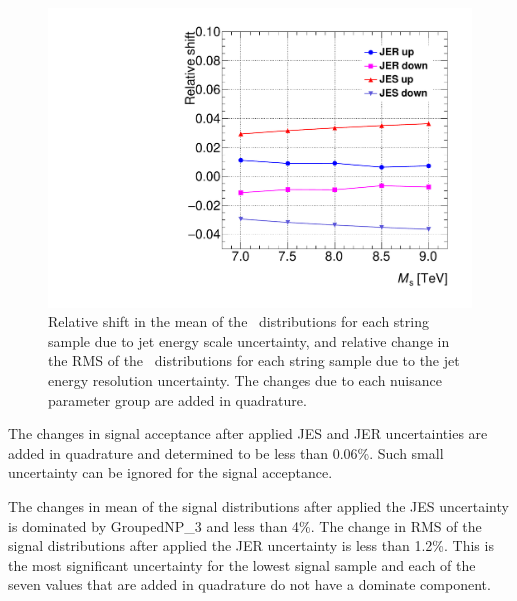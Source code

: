 \begin{figure}[htb]
\begin{center}
\includegraphics[width=0.65\linewidth]{fig/strings/JES_JER}
\end{center}
\caption{Relative shift in the mean of the \mjj\ distributions for each
string sample due to jet energy scale uncertainty, and relative change
in the RMS of the \mjj\ distributions for each string sample due to the
jet energy resolution uncertainty.
The changes due to each nuisance parameter group are added in
quadrature.}
\label{fig3}
\end{figure}

The changes in signal acceptance after applied JES and JER uncertainties are
added in quadrature and determined to be less than 0.06\%.  Such small uncertainty can be ignored for the signal
acceptance.


The changes in mean of the signal distributions after applied the JES uncertainty is dominated by GroupedNP\_3 and less than 4\%. The change in RMS of the signal distributions after applied the JER uncertainty
is less than 1.2\%. This is the most significant uncertainty for the lowest \Ms signal sample and
each of the seven values that are added in quadrature do not have a
dominate component.


\FloatBarrier